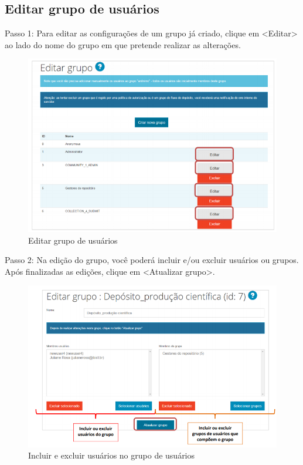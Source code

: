 \documentclass[12pt,hidelinks]{article}
\begin{document}
    \subsection{Editar grupo de usuários}
    
    Passo 1: Para editar as configurações de um grupo já criado, clique em <Editar> ao lado do nome do grupo em que pretende realizar as alterações. 
    
    \begin{figure}[!htp]
                \centering
                \includegraphics[scale=0.8]{figura/Figura69.png}
                \caption{Editar grupo de usuários}
            \label{Rotulo}
        \end{figure}
        
    Passo 2: Na edição do grupo, você poderá incluir e/ou excluir usuários ou grupos. Após finalizadas as edições, clique em <Atualizar grupo>.
    
    \begin{figure}[!htp]
                \centering
                \includegraphics[scale=0.7]{figura/Figura70.png}
                \caption{Incluir e excluir usuários no grupo de usuários}
            \label{Rotulo}
        \end{figure}
\end{document}
